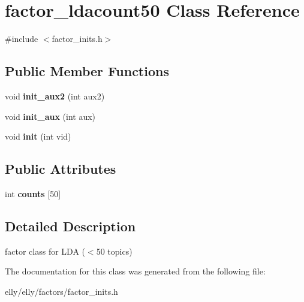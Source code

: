 \hypertarget{classfactor__ldacount50}{\section{factor\-\_\-ldacount50 Class Reference}
\label{classfactor__ldacount50}
}


{\ttfamily \#include $<$factor\-\_\-inits.\-h$>$}

\subsection*{Public Member Functions}
\begin{DoxyCompactItemize}
\item 
\hypertarget{classfactor__ldacount50_a852c648d68d6067e18bfece3af25f30c}{void {\bfseries init\-\_\-aux2} (int aux2)}\label{classfactor__ldacount50_a852c648d68d6067e18bfece3af25f30c}

\item 
\hypertarget{classfactor__ldacount50_a8d028cf2625f639fd07997a9461e231d}{void {\bfseries init\-\_\-aux} (int aux)}\label{classfactor__ldacount50_a8d028cf2625f639fd07997a9461e231d}

\item 
\hypertarget{classfactor__ldacount50_aa53bf93ed30196edaa617624495c509d}{void {\bfseries init} (int vid)}\label{classfactor__ldacount50_aa53bf93ed30196edaa617624495c509d}

\end{DoxyCompactItemize}
\subsection*{Public Attributes}
\begin{DoxyCompactItemize}
\item 
\hypertarget{classfactor__ldacount50_aace3b3d0a4697ebb3baf4479fb5840f8}{int {\bfseries counts} \mbox{[}50\mbox{]}}\label{classfactor__ldacount50_aace3b3d0a4697ebb3baf4479fb5840f8}

\end{DoxyCompactItemize}


\subsection{Detailed Description}
factor class for L\-D\-A ($<$50 topics) 

The documentation for this class was generated from the following file\-:\begin{DoxyCompactItemize}
\item 
elly/elly/factors/factor\-\_\-inits.\-h\end{DoxyCompactItemize}
